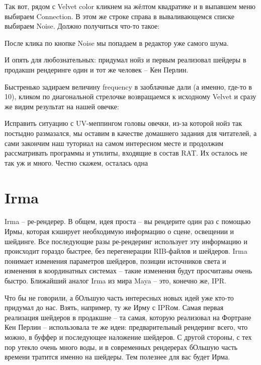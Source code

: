 Так вот, рядом с Velvet color кликнем на жёлтом
    квадратике и в выпавшем меню выбираем Connection. В этом же строке
    справа в вываливающемся списке выбираем Noise. Должно получиться
    что-то такое:


 После клика по кнопке Noise мы попадаем в редактор
    уже самого шума.

 И опять для
    любознательных: придумал нойз и
    первым реализовал шейдеры в продакшн рендеринге один и тот же
    человек – Кен Перлин.

 Быстренько задираем величину frequency в заоблачные
    дали (а именно, где-то в 10), кликом по диагональной стрелочке
    возвращаемся к исходному Velvet и сразу же видим результат на нашей
    овечке:


 Исправить ситуацию с UV-меппингом головы овечки,
    из-за которой нойз так постыдно размазался, мы оставим в качестве
    домашнего задания для читателей, а сами закончим наш туториал на
    самом интересном месте и продолжим рассматривать программы и
    утилиты, входящие в состав RAT. Их осталось не так уж и много.
    Честно скажем, осталась одна
  
\section*{Irma}

 Irma – ре-рендерер. В общем, идея проста – вы
    рендерите один раз с помощью Ирмы, которая кэширует необходимую
    информацию о сцене, освещении и шейдинге. Все последующие разы
    ре-рендеринг использует эту информацию и происходит гораздо
    быстрее, без перегенерации RIB-файлов и шейдеров. Irma понимает
    изменения параметров шейдеров, позиции источников света и изменения
    в координатных системах – такие изменения будут просчитаны очень
    быстро. Ближайший аналог Irma из мира Maya – это, конечно же,
    IPR.

 Что бы не говорили, а бОльшую часть интересных
    новых идей уже кто-то придумал до нас. Взять, например, ту же Ирму
    с IPRом. Самая первая реализация шейдеров в продакшне – та самая,
    которую реализовал на Фортране Кен Перлин – использовала те же
    идеи: предварительный рендеринг всего, что можно, в буффер и
    последующее наложение шейдеров. С другой стороны, с тех пор утекло
    очень много воды, и в современных рендерерах бОльшую часть времени
    тратится именно на шейдеры. Тем полезнее для вас будет
    Ирма.
